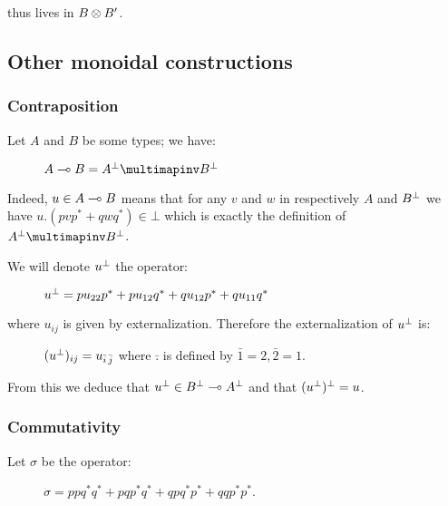 thus lives in \(B\otimes B'\).

\subsection{Other monoidal constructions}\label{other-monoidal-constructions}

\subsubsection{Contraposition}\label{contraposition}

Let \(A\) and \(B\) be some types; we have:

\begin{description}
\item[]
\(A\limp B = A\orth\limpinv B\orth\)
\end{description}

Indeed, \(u\in A\multimap B\) means that for any \(v\) and \(w\) in
respectively \(A\) and \(B^\bot\) we have \(u.(pvp^* + qwq^*)\in\bot\)
which is exactly the definition of \(A\orth\limpinv B\orth\).

We will denote \(u^\bot\) the operator:

\begin{description}
\item[]
\(u^\bot = pu_{22}p^* + pu_{12}q^* + qu_{12}p^* + qu_{11}q^*\)
\end{description}

where \(u_{ij}\) is given by externalization. Therefore the
externalization of \(u^\bot\) is:

\begin{description}
\item[]
\((u^\bot)_{ij} = u_{\bar i\,\bar j}\) where \(\bar .\) is defined by
\(\bar1 = 2, \bar2 = 1\).
\end{description}

From this we deduce that \(u^\bot\in B^\bot\multimap A^\bot\) and that
\((u^\bot)^\bot = u\).

\subsubsection{Commutativity}\label{commutativity}

Let \(\sigma\) be the operator:

\begin{description}
\item[]
\(\sigma = ppq^*q^* +pqp^*q^* + qpq^*p^* + qqp^*p^*\).
\end{description}


